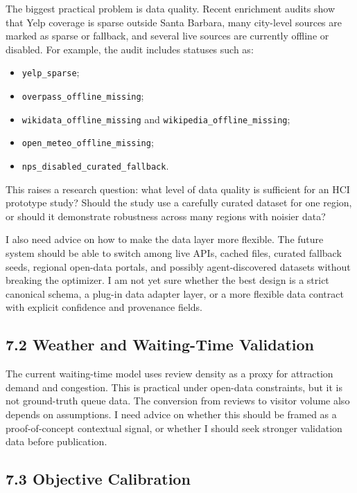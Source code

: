 \documentclass[11pt,a4paper]{article}
\begin{document}
\noindent The biggest practical problem is data quality. Recent enrichment audits show that Yelp coverage is sparse outside Santa Barbara, many city-level sources are marked as sparse or fallback, and several live sources are currently offline or disabled. For example, the audit includes statuses such as:

\begin{itemize}
    \item \texttt{yelp\_sparse};
    \item \texttt{overpass\_offline\_missing};
    \item \texttt{wikidata\_offline\_missing} and \texttt{wikipedia\_offline\_missing};
    \item \texttt{open\_meteo\_offline\_missing};
    \item \texttt{nps\_disabled\_curated\_fallback}.
\end{itemize}

\vspace{0.5em}
\noindent This raises a research question: what level of data quality is sufficient for an HCI prototype study? Should the study use a carefully curated dataset for one region, or should it demonstrate robustness across many regions with noisier data?

\vspace{0.5em}
\noindent I also need advice on how to make the data layer more flexible. The future system should be able to switch among live APIs, cached files, curated fallback seeds, regional open-data portals, and possibly agent-discovered datasets without breaking the optimizer. I am not yet sure whether the best design is a strict canonical schema, a plug-in data adapter layer, or a more flexible data contract with explicit confidence and provenance fields.

\subsection*{7.2 Weather and Waiting-Time Validation}

\noindent The current waiting-time model uses review density as a proxy for attraction demand and congestion. This is practical under open-data constraints, but it is not ground-truth queue data. The conversion from reviews to visitor volume also depends on assumptions. I need advice on whether this should be framed as a proof-of-concept contextual signal, or whether I should seek stronger validation data before publication.

\subsection*{7.3 Objective Calibration}
\end{document}

